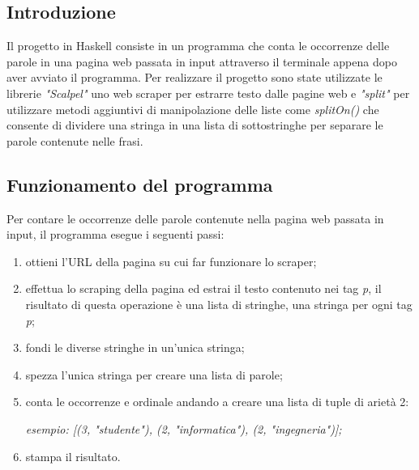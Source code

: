 \documentclass[a4paper, 11pt]{article}
\begin{document}
\subsection{Introduzione}
Il progetto in Haskell consiste in un programma che conta le occorrenze delle parole in una pagina web passata in input attraverso il terminale appena dopo aver avviato il programma.
Per realizzare il progetto sono state utilizzate le librerie \textit{"Scalpel"} uno web scraper per estrarre testo dalle pagine web e \textit{"split"} per utilizzare metodi aggiuntivi di manipolazione delle liste come \textit{splitOn()} che consente di dividere una stringa in una lista di sottostringhe per separare le parole contenute nelle frasi.

\subsection{Funzionamento del programma}
Per contare le occorrenze delle parole contenute nella pagina web passata in input, il programma esegue i seguenti passi:
\begin{enumerate}
\item ottieni l'URL della pagina su cui far funzionare lo scraper;
\item effettua lo scraping della pagina ed estrai il testo contenuto nei tag \textit{p}, il risultato di questa operazione è una lista di stringhe, una stringa per ogni tag \textit{p};
\item fondi le diverse stringhe in un'unica stringa;
\item spezza l'unica stringa per creare una lista di parole;
\item conta le occorrenze e ordinale andando a creare una lista di tuple di arietà 2:

\textit{esempio: [(3, "studente"), (2, "informatica"), (2, "ingegneria")];}
\item stampa il risultato.

\end{enumerate}
\end{document}
